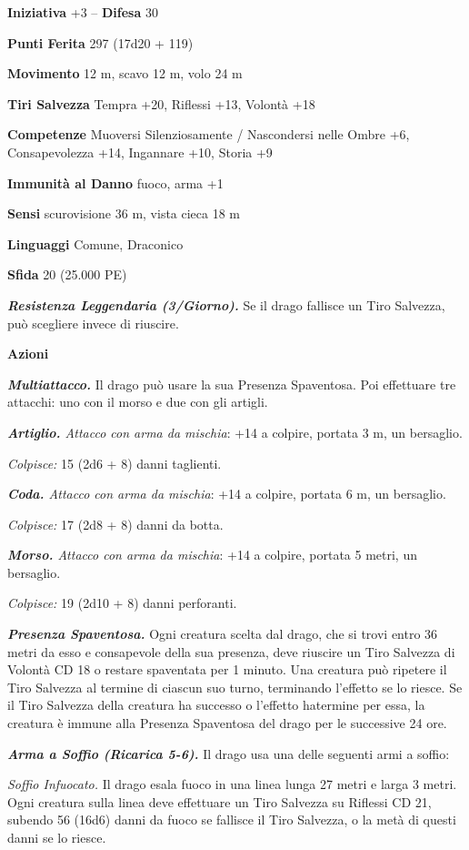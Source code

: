 \begin{multicols}{2}
\textbf{Iniziativa} +3 -- \textbf{Difesa} 30

\textbf{Punti Ferita} 297 (17d20 + 119)

\textbf{Movimento} 12 m, scavo 12 m, volo 24 m

\textbf{Tiri Salvezza} Tempra +20, Riflessi +13, Volontà +18

\textbf{Competenze} Muoversi Silenziosamente / Nascondersi nelle Ombre +6, Consapevolezza +14, Ingannare +10, Storia +9 

\textbf{Immunità al Danno} fuoco, arma +1

\textbf{Sensi} scurovisione 36 m, vista cieca 18 m

\textbf{Linguaggi} Comune, Draconico

\textbf{Sfida} 20 (25.000 PE)

\emph{\textbf{Resistenza Leggendaria (3/Giorno).}} Se il drago fallisce un Tiro Salvezza, può scegliere invece di riuscire.

\textbf{Azioni}

\emph{\textbf{Multiattacco.}} Il drago può usare la sua Presenza Spaventosa. Poi effettuare tre attacchi: uno con il morso e due con gli artigli.

\emph{\textbf{Artiglio.} Attacco con arma da mischia}: +14 a colpire, portata 3 m, un bersaglio.

\emph{Colpisce:} 15 (2d6 + 8) danni taglienti.

\emph{\textbf{Coda.} Attacco con arma da mischia}: +14 a colpire, portata 6 m, un bersaglio.

\emph{Colpisce:} 17 (2d8 + 8) danni da botta.

\emph{\textbf{Morso.} Attacco con arma da mischia}: +14 a colpire, portata 5 metri, un bersaglio.

\emph{Colpisce:} 19 (2d10 + 8) danni perforanti.

\emph{\textbf{Presenza Spaventosa.}} Ogni creatura scelta dal drago, che si trovi entro 36 metri da esso e consapevole della sua presenza, deve riuscire un Tiro Salvezza di Volontà CD 18 o restare spaventata per 1 minuto. Una creatura può ripetere il Tiro Salvezza al termine di ciascun suo turno, terminando l'effetto se lo riesce. Se il Tiro Salvezza della creatura ha successo o l'effetto hatermine per essa, la creatura è immune alla Presenza Spaventosa del drago per le successive 24 ore.

\emph{\textbf{Arma a Soffio (Ricarica 5-6).}} Il drago usa una delle seguenti armi a soffio:

\emph{Soffio Infuocato.} Il drago esala fuoco in una linea lunga 27 metri e larga 3 metri. Ogni creatura sulla linea deve effettuare un Tiro Salvezza su Riflessi CD 21, subendo 56 (16d6) danni da fuoco se fallisce il Tiro Salvezza, o la metà di questi danni se lo riesce.


\end{multicols}
